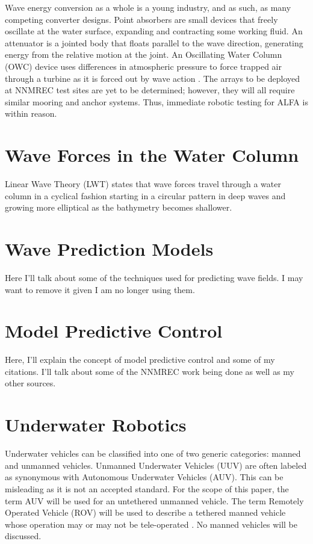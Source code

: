 \documentclass[double,12pt]{beavtex}
\begin{document}
Wave energy conversion as a whole is a young industry, and as such, as many competing converter designs. Point absorbers are small devices that freely oscillate at the water surface, expanding and contracting some working fluid. An attenuator is a jointed body that floats parallel to the wave direction, generating energy from the relative motion at the joint. An Oscillating Water Column (OWC) device uses differences in atmospheric pressure to force trapped air through a turbine as it is forced out by wave action \cite{falnes}. The arrays to be deployed at NNMREC test sites are yet to be determined; however, they will all require similar mooring and anchor systems. Thus, immediate robotic testing for ALFA is within reason.

\section{Wave Forces in the Water Column}

Linear Wave Theory (LWT) states that wave forces travel through a water column in a cyclical fashion starting in a circular pattern in deep waves and growing more elliptical as the bathymetry becomes shallower.

\section{Wave Prediction Models}

Here I'll talk about some of the techniques used for predicting wave fields. I may want to remove it given I am no longer using them.

\section{Model Predictive Control} 

Here, I'll explain the concept of model predictive control and some of my citations. I'll talk about some of the NNMREC work being done as well as my other sources.  

\section{Underwater Robotics}

Underwater vehicles can be classified into one of two generic categories: manned and unmanned vehicles. Unmanned Underwater Vehicles (UUV) are often labeled as synonymous with Autonomous Underwater Vehicles (AUV). This can be misleading as it is not an accepted standard. For the scope of this paper, the term AUV will be used for an untethered unmanned vehicle. The term Remotely Operated Vehicle (ROV) will be used to describe a tethered manned vehicle whose operation may or may not be tele-operated \cite{ROV}. No manned vehicles will be discussed.
\end{document}
